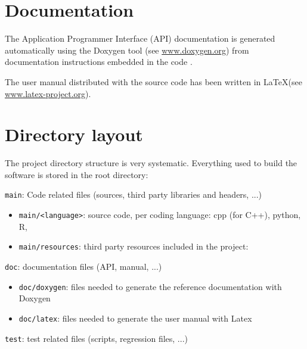 %
\section{Documentation}
\label{section:documentation}

The Application Programmer Interface (API) documentation is generated automatically
using the Doxygen tool (see \url{www.doxygen.org}) from documentation instructions
embedded in the code .

The user manual distributed with the source code has been written in \LaTeX (see \url{www.latex-project.org}).



%
\section{Directory layout}

The project directory structure is very systematic.
Everything used to build the software is stored in the root directory:
\begin{compactitem}
    \item \texttt{main}: Code related files (sources, third party libraries and headers, ...)
      	\begin{itemize}
        		\item \texttt{main/<language>}: source code, per coding language: cpp (for C++), python, R,
        		\item \texttt{main/resources}: third party resources included in the project:
        \end{itemize}
    \item \texttt{doc}: documentation files (API, manual, ...)
      	\begin{itemize}
        		\item \texttt{doc/doxygen}: files needed to generate the reference documentation with Doxygen
        		\item \texttt{doc/latex}: files needed to generate the user manual with Latex
        \end{itemize}
    \item \texttt{test}: test related files (scripts, regression files, ...)
\end{compactitem}

